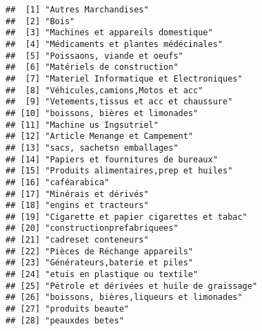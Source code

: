 \documentclass[
]{book}
\begin{document}
\begin{verbatim}
##  [1] "Autres Marchandises"                      
##  [2] "Bois"                                     
##  [3] "Machines et appareils domestique"         
##  [4] "Médicaments et plantes médécinales"       
##  [5] "Poissaons, viande et oeufs"               
##  [6] "Matériels de construction"                
##  [7] "Materiel Informatique et Electroniques"   
##  [8] "Véhicules,camions,Motos et acc"           
##  [9] "Vetements,tissus et acc et chaussure"     
## [10] "boissons, bières et limonades"            
## [11] "Machine us Ingsutriel"                    
## [12] "Article Menange et Campement"             
## [13] "sacs, sachetsn emballages"                
## [14] "Papiers et fournitures de bureaux"        
## [15] "Produits alimentaires,prep et huiles"     
## [16] "caféarabica"                              
## [17] "Minérais et dérivés"                      
## [18] "engins et tracteurs"                      
## [19] "Cigarette et papier cigarettes et tabac"  
## [20] "constructionprefabriquees"                
## [21] "cadreset conteneurs"                      
## [22] "Pièces de Réchange appareils"             
## [23] "Générateurs,baterie et piles"             
## [24] "etuis en plastique ou textile"            
## [25] "Pétrole et dérivées et huile de graissage"
## [26] "boissons, bières,liqueurs et limonades"   
## [27] "produits beaute"                          
## [28] "peauxdes betes"
\end{verbatim}
\end{document}
